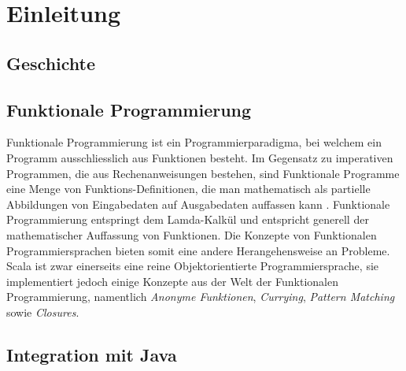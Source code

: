 \chapter{Einleitung}

\section{Geschichte}

\section{Funktionale Programmierung}

Funktionale Programmierung ist ein Programmierparadigma, bei welchem
ein Programm ausschliesslich aus Funktionen besteht. Im Gegensatz
zu imperativen Programmen, die aus Rechenanweisungen bestehen, sind
Funktionale Programme eine Menge von Funktions-Definitionen, die man
mathematisch als partielle Abbildungen von Eingabedaten auf Ausgabedaten
auffassen kann \cite{wikipediaFunktional}. Funktionale Programmierung
entspringt dem Lamda-Kalkül und entspricht generell der mathematischer
Auffassung von Funktionen. Die Konzepte von Funktionalen
Programmiersprachen bieten somit eine andere Herangehensweise an Probleme.\\

Scala ist zwar einerseits eine reine Objektorientierte Programmiersprache,
sie implementiert jedoch einige Konzepte aus der Welt der Funktionalen
Programmierung, namentlich \emph{Anonyme Funktionen}, \emph{Currying},
\emph{Pattern Matching} sowie \emph{Closures}.


\section{Integration mit Java}
